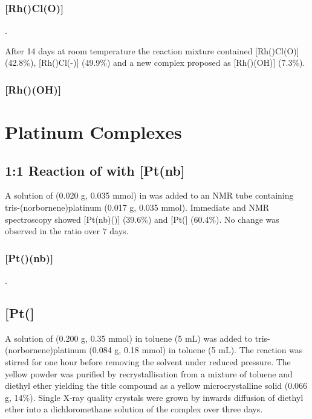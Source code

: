 \subsubsection{[Rh(\tBuxantphos)Cl(O)]}

.

After 14 days at room temperature the reaction mixture contained [Rh(\tBuxantphos)Cl(O)] (42.8\%), [Rh(\tBuxantphos)Cl(-)] (49.9\%) and a new complex proposed as [Rh(\tBuxantphos)(OH)] (7.3\%).

\subsubsection{[Rh(\tBuxantphos)(OH)]}


\section{Platinum Complexes}
\label{section:experimental:platinum}


\subsection*{1:1 Reaction of \Phthixantphos{} with [Pt(nb]}

A solution of \Phthixantphos{} (0.020 g, 0.035 mmol) in  was added to an NMR tube containing tris-(norbornene)platinum (0.017 g, 0.035 mmol).  Immediate \proton{} and \phosphorus{} NMR spectroscopy showed [Pt(nb)(\Phthixantphos)] (39.6\%) and [Pt(\Phthixantphos{}] (60.4\%).  No change was observed in the ratio over 7 days.   

\subsubsection{[Pt(\Phthixantphos)(nb)]}

.

\subsection*{\texorpdfstring{[Pt(\Phthixantphos{}]} P}

A solution of \Phthixantphos{} (0.200 g, 0.35 mmol) in toluene (5 mL) was added to tris-(norbornene)platinum (0.084 g, 0.18 mmol) in toluene (5 mL).  The reaction was stirred for one hour before removing the solvent under reduced pressure.  The yellow powder was purified by recrystallisation from a mixture of toluene and diethyl ether yielding the title compound as a yellow microcrystalline solid (0.066 g, 14\%).  Single X-ray quality crystals were grown by inwards diffusion of diethyl ether into a dichloromethane solution of the complex over three days.  

